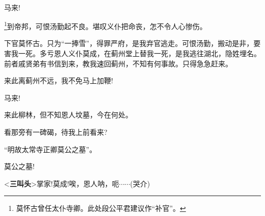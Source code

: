 \newpage\hspace{30pt}~

{%

\subsubsection{\large{}}

{\vspace{5pt}}

{马来!}\hspace{40pt}~

\footnote{莫怀古曾任太仆寺卿。此处段公平君建议作``补官''。}{到帝邦，可恨汤勤起不良。堪叹义仆把命丧，怎不令人心惨伤。}

{下官莫怀古。只为``一捧雪''，得罪严府，是我弃官逃走。可恨汤勤，搬动是非，要害我一死。多亏恩人义仆莫成，在蓟州堂上替我一死，是我逃往湖北，隐姓埋名。前者戚贤弟有书信到来，教我速回蓟州，不知有何事故。只得急急赶来。}

{来此离蓟州不远，我不免马上加鞭!}



{\vspace{5pt}}

{马来!}\hspace{40pt}~


{来此柳林，但不知恩人坟墓，今在何处。}

{看那旁有一碑碣，待我上前看来?}

{``明故太常寺正卿莫公之墓''。}

{莫公之墓!}\hspace{30pt}~

{\textless{}{\!\bfseries\akai 三叫头}\!\textgreater{}掌家!莫成!唉，恩人呐，呃$\cdots{}\cdots{}$({\hwfs 哭}{\hwfs 介})}


}
